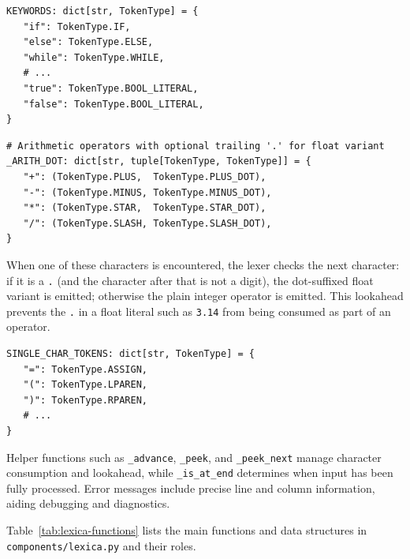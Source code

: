 \begin{lstlisting}
KEYWORDS: dict[str, TokenType] = {
   "if": TokenType.IF,
   "else": TokenType.ELSE,
   "while": TokenType.WHILE,
   # ...
   "true": TokenType.BOOL_LITERAL,
   "false": TokenType.BOOL_LITERAL,
}
\end{lstlisting}

\begin{lstlisting}
# Arithmetic operators with optional trailing '.' for float variant
_ARITH_DOT: dict[str, tuple[TokenType, TokenType]] = {
   "+": (TokenType.PLUS,  TokenType.PLUS_DOT),
   "-": (TokenType.MINUS, TokenType.MINUS_DOT),
   "*": (TokenType.STAR,  TokenType.STAR_DOT),
   "/": (TokenType.SLASH, TokenType.SLASH_DOT),
}
\end{lstlisting}

When one of these characters is encountered, the lexer checks the next
character: if it is a \texttt{.} (and the character after that is not a digit),
the dot-suffixed float variant is emitted; otherwise the plain integer operator
is emitted. This lookahead prevents the \texttt{.} in a float literal such as
\texttt{3.14} from being consumed as part of an operator.

\begin{lstlisting}
SINGLE_CHAR_TOKENS: dict[str, TokenType] = {
   "=": TokenType.ASSIGN,
   "(": TokenType.LPAREN,
   ")": TokenType.RPAREN,
   # ...
}
\end{lstlisting}

Helper functions such as \texttt{\_advance}, \texttt{\_peek}, and
\texttt{\_peek\_next} manage character consumption and lookahead, while
\texttt{\_is\_at\_end} determines when input has been fully processed. Error
messages include precise line and column information, aiding debugging and
diagnostics.

Table~\ref{tab:lexica-functions} lists the main functions and data structures
in \texttt{components/lexica.py} and their roles.

